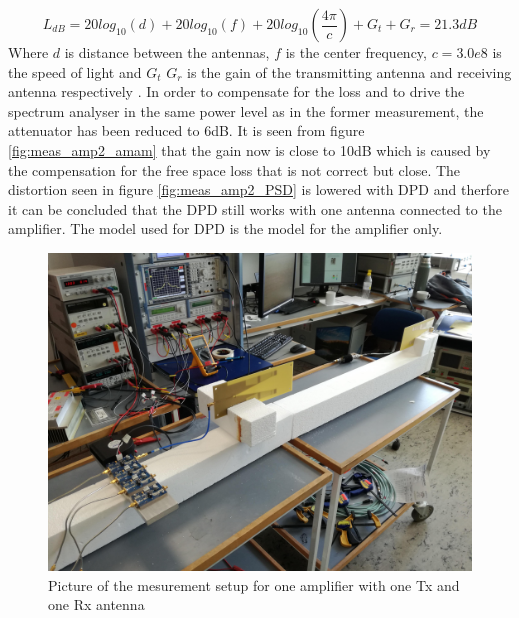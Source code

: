 \begin{equation}
 L_{dB} = 20log_{10}(d)+20log_{10}(f)+20log_{10}(\frac{4\pi}{c})+G_t+G_r = 21.3dB
\end{equation}
Where $d$ is distance between the antennas, $f$ is the center frequency, $c=3.0e8$ is the speed of light and $G_t$ $G_r$ is the gain of the transmitting antenna and receiving antenna respectively \citep{Balanis2005}. In order to compensate for the loss and to drive the spectrum analyser in the same power level as in the former measurement, the attenuator has been reduced to 6dB. It is seen from figure \ref{fig:meas_amp2_amam} that the gain now is close to 10dB which is caused by the compensation for the free space loss that is not correct but close. The distortion seen in figure \ref{fig:meas_amp2_PSD} is lowered with DPD and therfore it can be concluded that the DPD still works with one antenna connected to the amplifier. The model used for DPD is the model for the amplifier only.     


\begin{figure}[H]
\centering 
\includegraphics[scale = 0.06]{figures/measurement/cree/meas2/meas2.jpg}
\caption{Picture of the mesurement setup for one amplifier with one Tx and one Rx antenna }
\label{fig:meas_amp2_pic}
\end{figure}



